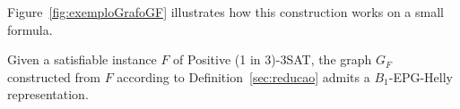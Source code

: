 \documentclass[runningheads]{llncs}
\begin{document}
Figure~\ref{fig:exemploGrafoGF} illustrates how this construction works on a small formula. %



\begin{lemma}\label{lem:ida}
Given a satisfiable instance $F$ of {\sc Positive (1 in 3)-3SAT}, the graph $G_F$ constructed from $F$ according to Definition~\ref{sec:reducao} admits a $B_{1}$-EPG-Helly representation.
\end{lemma}





% 


% 



% 


\end{document}
